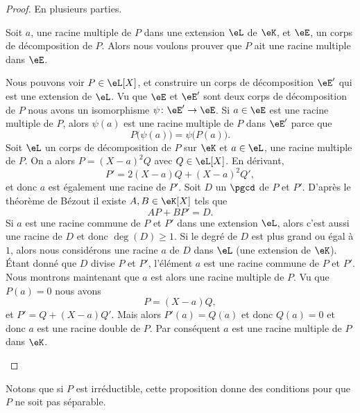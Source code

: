 \begin{proof}
    En plusieurs parties.
	\begin{subproof}
		\spitem[\ref{ItemdqPFUi}\( \Rightarrow\)\ref{ItemdqPFUib}] Soit \( a\), une racine multiple de \( P\) dans une extension \( \eL\) de \( \eK\), et \( \eE\), un corps de décomposition de \( P\). Alors nous voulons prouver que \( P\) ait une racine multiple dans \( \eE\).

		Nous pouvons voir \( P\in \eL[X]\), et construire un corps de décomposition \( \eE'\) qui est une extension de \( \eL\). Vu que \( \eE\) et \( \eE'\) sont deux corps de décomposition de \( P\)
		nous avons un isomorphisme \( \psi\colon \eE'\to \eE\). Si \( a\in \eE\) est une racine multiple de \( P\), alors \( \psi(a)\) est une racine multiple de \( P\) dans \( \eE'\) parce que
		\begin{equation}
			P\big( \psi(a) \big)=\psi\big( P(a) \big).
		\end{equation}
		\spitem[\ref{ItemdqPFUib}\( \Rightarrow\)\ref{ItemdqPFUii}] Soit \( \eL\) un corps de décomposition de \( P\) sur \( \eK\) et \( a\in \eL\), une racine multiple de \( P\). On a alors \( P=(X-a)^2Q\) avec \( Q\in \eL[X]\). En dérivant,
		\begin{equation}
			P'=2(X-a)Q+(X-a)^2Q',
		\end{equation}
		et donc \( a\) est également une racine de \( P'\).
		\spitem[\ref{ItemdqPFUii}\( \Rightarrow\)\ref{ItemdqPFUiii}] Soit \( D\) un \( \pgcd\) de \( P\) et \( P'\). D'après le théorème de Bézout il existe \( A,B\in \eK[X]\) tels que
		\begin{equation}
			AP+BP'=D.
		\end{equation}
		Si \( a\) est une racine commune de \( P\) et \( P'\) dans une extension \( \eL\), alors c'est aussi une racine de \( D\) et donc \( \deg(D)\geq 1\).
		\spitem[\ref{ItemdqPFUiii}\(\Rightarrow\)\ref{ItemdqPFUi}] Si le degré de \( D\) est plus grand ou égal à \( 1\), alors nous considérons une racine \( a\) de \( D\) dans \( \eL\) (une extension de \( \eK\)). Étant donné que \( D\) divise \( P\) et \( P'\), l'élément \( a\) est une racine commune de \( P\) et \( P'\). Nous montrons maintenant que \( a\) est alors une racine multiple de \( P\). Vu que \( P(a)=0\) nous avons
		\begin{equation}
			P=(X-a)Q,
		\end{equation}
		et \( P'=Q+(X-a)Q'\). Mais alors \( P'(a)=Q(a)\) et donc \( Q(a)=0\) et donc \( a\) est une racine double de \( P\). Par conséquent \( a\) est une racine multiple de \( P\) dans \( \eK\).
	\end{subproof}
\end{proof}
Notons que si \( P\) est irréductible, cette proposition donne des conditions pour que \( P\) ne soit pas séparable.


